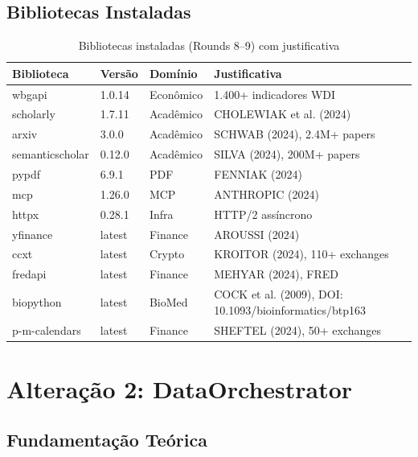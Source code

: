 \documentclass[12pt,a4paper]{article}
\begin{document}
\subsection{Bibliotecas Instaladas}

\begin{table}[H]
  \centering
  \caption{Bibliotecas instaladas (Rounds 8--9) com justificativa}
  \begin{tabular}{l l l l}
    \toprule
    \textbf{Biblioteca} & \textbf{Versão} & \textbf{Domínio} & \textbf{Justificativa} \\
    \midrule
    wbgapi      & 1.0.14 & Econômico  & 1.400+ indicadores WDI \\
    scholarly   & 1.7.11 & Acadêmico  & CHOLEWIAK et al. (2024) \\
    arxiv       & 3.0.0  & Acadêmico  & SCHWAB (2024), 2.4M+ papers \\
    semanticscholar & 0.12.0 & Acadêmico & SILVA (2024), 200M+ papers \\
    pypdf       & 6.9.1  & PDF        & FENNIAK (2024) \\
    mcp         & 1.26.0 & MCP        & ANTHROPIC (2024) \\
    httpx       & 0.28.1 & Infra      & HTTP/2 assíncrono \\
    yfinance    & latest & Finance    & AROUSSI (2024) \\
    ccxt        & latest & Crypto     & KROITOR (2024), 110+ exchanges \\
    fredapi     & latest & Finance    & MEHYAR (2024), FRED \\
    biopython   & latest & BioMed     & COCK et al. (2009), DOI: 10.1093/bioinformatics/btp163 \\
    p-m-calendars & latest & Finance  & SHEFTEL (2024), 50+ exchanges \\
    \bottomrule
  \end{tabular}
\end{table}

\section{Alteração 2: DataOrchestrator}

\subsection{Fundamentação Teórica}
\end{document}
